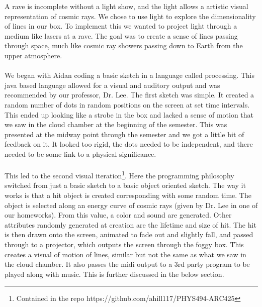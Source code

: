 \documentclass{article}
\begin{document}
A rave is incomplete without a light show, and the light allows a artistic visual representation of cosmic rays. We chose to use light to explore the dimensionality of lines in our box. To implement this we wanted to project light through a medium like lasers at a rave. The goal was to create a sense of lines passing through space, much like cosmic ray showers passing down to Earth from the upper atmosphere. 
\\\\
We began with Aidan coding a basic sketch in a language called processing. This java based language allowed for a visual and auditory output and was recommended by our professor, Dr. Lee. The first sketch was simple. It created a random number of dots in random positions on the screen at set time intervals. This ended up looking like a strobe in the box and lacked a sense of motion that we saw in the cloud chamber at the beginning of the semester. This was presented at the midway point through the semester and we got a little bit of feedback on it. It looked too rigid, the dots needed to be independent, and there needed to be some link to a physical significance.
\\\\
 This led to the second visual iteration\footnote{Contained in the repo https://github.com/ahill117/PHYS494-ARC425}. Here the programming philosophy switched from just a basic sketch to a basic object oriented sketch. The way it works is that a hit object is created corresponding with some random time. The object is selected along an energy curve of cosmic rays (given by Dr. Lee in one of our homeworks). From this value, a color and sound are generated. Other attributes randomly generated at creation are the lifetime and size of hit. The hit is then drawn onto the screen, animated to fade out and slightly fall, and passed through to a projector, which outputs the screen through the foggy box. This creates a visual of motion of lines, similar but not the same as what we saw in the cloud chamber. It also passes the midi output to a 3rd party program to be played along with music. This is further discussed in the below section.
\end{document}
